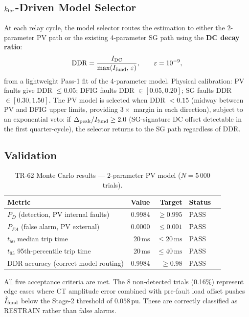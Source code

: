 \subsection{$k_{\rm ibr}$-Driven Model Selector}
\label{sec:ch6_pv_selector}

At each relay cycle, the model selector routes the estimation to either the
2-parameter PV path or the existing 4-parameter SG path using the
\textbf{DC decay ratio}:
\begin{equation}
  \mathrm{DDR} = \frac{I_{\rm DC}}{\max(I_{\rm fund},\,\varepsilon)},
  \qquad \varepsilon = 10^{-9},
  \label{eq:ch6_ddr}
\end{equation}
from a lightweight Pass-1 fit of the 4-parameter model.
Physical calibration: PV faults give DDR $\leq 0.05$; DFIG faults
DDR $\in [0.05, 0.20]$; SG faults DDR $\in [0.30, 1.50]$.
The PV model is selected when DDR $< 0.15$ (midway between PV and DFIG
upper limits, providing $3\times$ margin in each direction), subject to an
exponential veto: if $\Delta_{\rm peak}/I_{\rm fund} \geq 2.0$ (SG-signature
DC offset detectable in the first quarter-cycle), the selector returns to the
SG path regardless of DDR.

\subsection{Validation}
\label{sec:ch6_pv_val}

\begin{table}[h]
  \centering
  \caption{TR-62 Monte Carlo results — 2-parameter PV model ($N = 5\,000$ trials).}
  \label{tab:ch6_pv_mc}
  \begin{tabular}{lrrll}
    \toprule
    Metric & Value & Target & Status \\
    \midrule
    $P_D$ (detection, PV internal faults) & 0.9984 & $\geq 0.995$ & PASS \\
    $P_{FA}$ (false alarm, PV external) & 0.0000 & $\leq 0.001$ & PASS \\
    $t_{50}$ median trip time & 20\,ms & $\leq 20\,\text{ms}$ & PASS \\
    $t_{95}$ 95th-percentile trip time & 20\,ms & $\leq 40\,\text{ms}$ & PASS \\
    DDR accuracy (correct model routing) & 0.9984 & $\geq 0.98$  & PASS \\
    \bottomrule
  \end{tabular}
\end{table}

All five acceptance criteria are met.  The 8 non-detected trials (0.16\%)
represent edge cases where CT amplitude error combined with pre-fault load offset
pushes $\hat{I}_{\rm fund}$ below the Stage-2 threshold of $0.058\,\text{pu}$.
These are correctly classified as RESTRAIN rather than false alarms.

